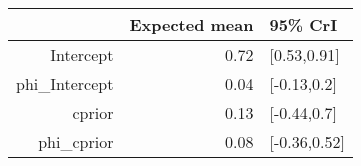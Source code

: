 \begin{tabular}{rrl}
  \hline
 & Expected mean & 95\% CrI \\ 
  \hline
Intercept & 0.72 & [0.53,0.91] \\ 
  phi\_Intercept & 0.04 & [-0.13,0.2] \\ 
  cprior & 0.13 & [-0.44,0.7] \\ 
  phi\_cprior & 0.08 & [-0.36,0.52] \\ 
   \hline
\end{tabular}

